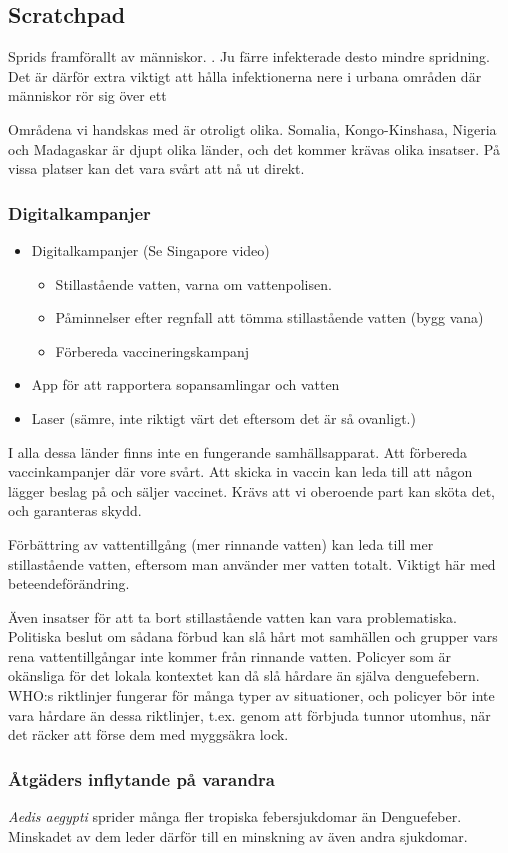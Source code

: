 \documentclass{article}
\begin{document}
\clearpage
\subsection{Scratchpad}
Sprids framförallt av människor. \cite[s. 16]{WHO:2009}. Ju färre infekterade desto mindre spridning. Det är därför extra viktigt att hålla infektionerna nere i urbana områden där människor rör sig över ett

Områdena vi handskas med är otroligt olika. Somalia, Kongo-Kinshasa, Nigeria och Madagaskar är djupt olika länder, och det kommer krävas olika insatser. På vissa platser kan det vara svårt att nå ut direkt.

\subsubsection{Digitalkampanjer}

\begin{itemize}
    \item Digitalkampanjer (Se Singapore video)
        \begin{itemize}
            \item Stillastående vatten, varna om vattenpolisen.
            \item Påminnelser efter regnfall att tömma stillastående vatten (bygg vana) \item Förbereda vaccineringskampanj
        \end{itemize}
    \item App för att rapportera sopansamlingar och vatten
    \item Laser (sämre, inte riktigt värt det eftersom det är så ovanligt.)
\end{itemize}

I alla dessa länder finns inte en fungerande samhällsapparat. Att förbereda vaccinkampanjer där vore svårt. Att skicka in vaccin kan leda till att någon lägger beslag på och säljer vaccinet. Krävs att vi oberoende part kan sköta det, och garanteras skydd.

Förbättring av vattentillgång (mer rinnande vatten) kan leda till mer stillastående vatten, eftersom man använder mer vatten totalt. Viktigt här med beteendeförändring.

Även insatser för att ta bort stillastående vatten kan vara problematiska. Politiska beslut om sådana förbud kan slå hårt mot samhällen och grupper vars rena vattentillgångar inte kommer från rinnande vatten. Policyer som är okänsliga för det lokala kontextet kan då slå hårdare än själva denguefebern. WHO:s riktlinjer \cite[s. 61]{WHO:2009} fungerar för många typer av situationer, och policyer bör inte vara hårdare än dessa riktlinjer, t.ex. genom att förbjuda tunnor utomhus, när det räcker att förse dem med myggsäkra lock.

\subsubsection{Åtgäders inflytande på varandra}

\emph{Aedis aegypti} sprider många fler tropiska febersjukdomar än Denguefeber. Minskadet av dem leder därför till en minskning av även andra sjukdomar.
 


\end{document}
